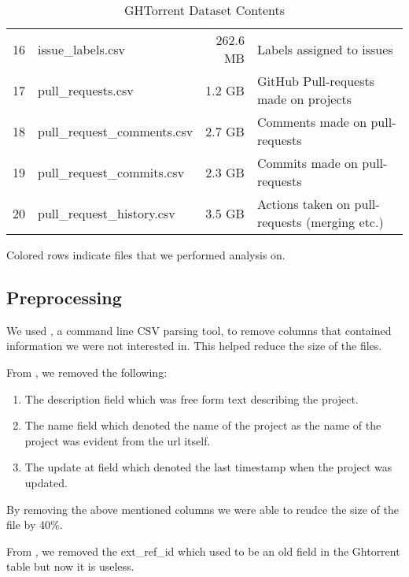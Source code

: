 \begin{table}[htb]
\begin{tabular}{@{}llrl@{}}
           16 & issue\_labels.csv           & 262.6 MB & Labels assigned to issues \\
           \rowcolor{LightCyan}
           17 & pull\_requests.csv          & 1.2 GB   & GitHub Pull-requests made on projects \\
           18 & pull\_request\_comments.csv & 2.7 GB   & Comments made on pull-requests \\
           19 & pull\_request\_commits.csv  & 2.3 GB   & Commits made on pull-requests \\
           20 & pull\_request\_history.csv  & 3.5 GB   & Actions taken on pull-requests (merging etc.) \\

        \bottomrule
    \end{tabular}

    \caption{GHTorrent Dataset Contents}
    \small{Colored rows indicate files that we performed analysis on.}
\end{table}

\newpage
\subsection{Preprocessing}

We used , a command line CSV parsing tool, to remove columns that contained information we were not interested in. This helped reduce the size of the files. \\ \linebreak

From , we removed the following:
\begin{enumerate}
    \item The description field which was free form text describing the project.
    \item The name field which denoted the name of the project as the name of the project was evident from the url itself.
    \item The update at field which denoted the last timestamp when the project was updated.
\end{enumerate}
By removing the above mentioned columns we were able to reudce the size of the file by 40\%. \\ \linebreak

From , we removed the ext\_ref\_id which used to be an old field in the Ghtorrent table but now it is useless. \\ \linebreak

